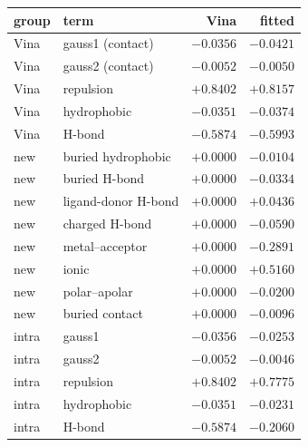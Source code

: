 \begin{tabular}{@{}llrr@{}}
\toprule
group & term & Vina & fitted \\
\midrule
Vina & gauss1 (contact) & $-0.0356$ & $-0.0421$ \\
Vina & gauss2 (contact) & $-0.0052$ & $-0.0050$ \\
Vina & repulsion & $+0.8402$ & $+0.8157$ \\
Vina & hydrophobic & $-0.0351$ & $-0.0374$ \\
Vina & H-bond & $-0.5874$ & $-0.5993$ \\
new & buried hydrophobic & $+0.0000$ & $-0.0104$ \\
new & buried H-bond & $+0.0000$ & $-0.0334$ \\
new & ligand-donor H-bond & $+0.0000$ & $+0.0436$ \\
new & charged H-bond & $+0.0000$ & $-0.0590$ \\
new & metal--acceptor & $+0.0000$ & $-0.2891$ \\
new & ionic & $+0.0000$ & $+0.5160$ \\
new & polar--apolar & $+0.0000$ & $-0.0200$ \\
new & buried contact & $+0.0000$ & $-0.0096$ \\
intra & gauss1 & $-0.0356$ & $-0.0253$ \\
intra & gauss2 & $-0.0052$ & $-0.0046$ \\
intra & repulsion & $+0.8402$ & $+0.7775$ \\
intra & hydrophobic & $-0.0351$ & $-0.0231$ \\
intra & H-bond & $-0.5874$ & $-0.2060$ \\
\bottomrule
\end{tabular}
